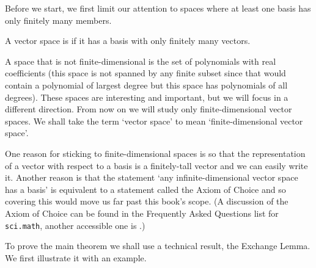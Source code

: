 Before we start, we first
limit our attention to spaces where at least one basis has only finitely
many members.

\begin{definition}
A vector space is %
if it has a basis with only finitely many vectors.
\end{definition}

\noindent A space that is not finite-dimensional is
the set of polynomials with real coefficients
(this space is not spanned by any finite subset since that would contain
a polynomial of largest degree but this space has polynomials of all degrees).
These spaces are interesting and important, but we will focus in a
different direction.
From now on we will study only finite-dimensional vector spaces.
We shall take the term `vector space' to mean 
`finite-dimensional vector space'.

\begin{remark}
One reason for sticking to finite-dimensional spaces is so that 
the representation of a vector with respect to a 
basis is a finitely-tall vector and we can easily write it.
Another reason is that 
the statement `any infinite-dimensional vector space has a basis'
is equivalent to a statement called the Axiom of Choice
\cite{Blass84} and so covering this would 
move us far past this book's scope.
(A discussion of the Axiom of Choice can be found in the
Frequently Asked Questions list for \texttt{sci.math},
another accessible one is \cite{Rucker}.)  
\end{remark}


To prove the main theorem we shall use a technical result, the Exchange Lemma.
We first illustrate it with an example.


